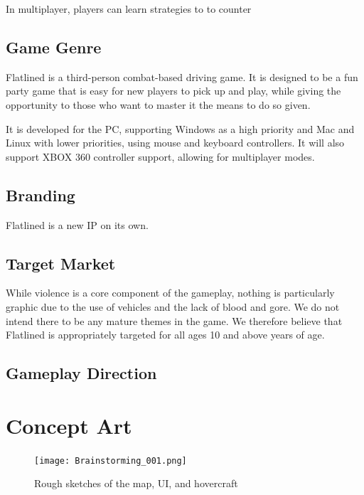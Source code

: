 \documentclass{article}
\newcommand{\name}{Flatlined}
\theoremstyle{definition}
\begin{document}
In multiplayer, players can learn strategies to to counter 

\subsection{Game Genre} %

\name{} is a third-person combat-based driving game. It is designed to be
a fun party game that is easy for new players to pick up and play, while giving
the opportunity to those who want to master it the means to do so given.

It is developed for the PC, supporting Windows as a high priority and Mac and
Linux with lower priorities, using mouse and keyboard controllers. It will also
support XBOX 360 controller support, allowing for multiplayer modes.

\subsection{Branding}

\name{} is a new IP on its own.

\subsection{Target Market}

While violence is a core component of the gameplay, nothing is particularly
graphic due to the use of vehicles and the lack of blood and gore. We do not
intend there to be any mature themes in the game. We therefore believe that
\name{} is appropriately targeted for all ages 10 and above years of age.

\subsection{Gameplay Direction} %


\section{Concept Art}

\begin{figure}[htpb]
  \centering
  \texttt{[image: Brainstorming\_001.png]}
  \caption{Rough sketches of the map, UI, and hovercraft}
\label{fig:Brainstorming_001}
\end{figure}
\end{document}
